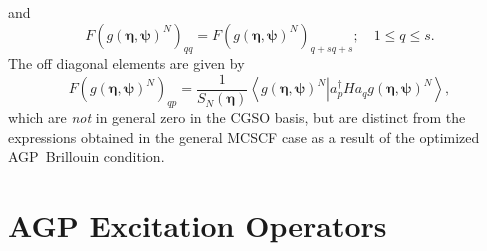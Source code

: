 \documentclass[aps,preprint]{revtex4}%
\begin{document}
and
\begin{equation}
F\left(  g\left(  \bm{\eta},\bm{\psi}\right)  ^{N}\right)  _{qq}=F\left(
g\left(  \bm{\eta},\bm{\psi}\right)  ^{N}\right)  _{q+sq+s};\quad1\leq q\leq
s.
\end{equation}
The off diagonal elements are given by
\begin{equation}
F\left(  g\left(  \bm{\eta},\bm{\psi}\right)  ^{N}\right)  _{qp}=\frac
{1}{S_{N}\left(  \bm{\eta}\right)  }\left\langle \left.  g\left(
\bm{\eta},\bm{\psi}\right)  ^{N}\right\vert a_{p}^{\dagger}Ha_{q}g\left(
\bm{\eta},\bm{\psi}\right)  ^{N}\right\rangle ,
\end{equation}
which are \emph{not }in general zero in the CGSO basis, but are distinct from
the expressions obtained in the general MCSCF case as a result of the
optimized AGP\ Brillouin condition.

\section{AGP Excitation Operators\label{q_op}}
\end{document}
